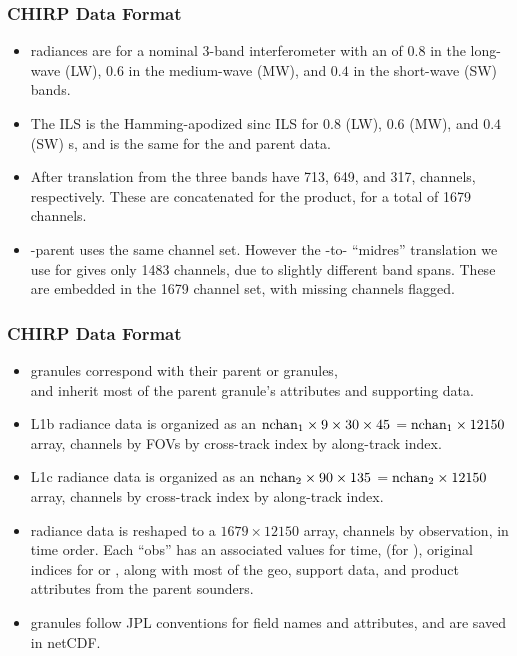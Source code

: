\documentclass[9pt]{beamer}
\begin{document}
\begin{frame}
\frametitle{CHIRP Data Format}
\begin{itemize}

  \item {\chirp} radiances are for a nominal 3-band interferometer 
    with an {\opd} of $0.8$ {\cm} in the long-wave (LW), $0.6$ {\cm}
    in the medium-wave (MW), and $0.4$ {\cm} in the short-wave (SW)
    bands.

  \item The {\chirp} ILS is the Hamming-apodized sinc ILS for $0.8$
    {\cm} (LW), $0.6$ {\cm} (MW), and $0.4$ {\cm} (SW) {\opd}s, and is
    the same for the {\airs} and {\cris} parent data.

  \item After translation from {\cris} the three bands have 713, 649,
    and 317, channels, respectively.  These are concatenated for the
    {\chirp} product, for a total of 1679 channels.

  \item {\airs}-parent {\chirp} uses the same channel set.  However
    the {\airs}-to-{\cris} ``midres'' translation we use for {\chirp}
    gives only 1483 channels, due to slightly different band spans.
    These are embedded in the 1679 channel set, with missing channels
    flagged.

\end{itemize}
\end{frame}
\begin{frame}
\frametitle{CHIRP Data Format}
\begin{itemize}

  \item {\chirp} granules correspond with their parent {\airs} or
    {\cris} granules, \\ and inherit most of the parent granule's
    attributes and supporting data.

  \item {\cris} L1b radiance data is organized as an $\mbox{nchan}_1
    \times 9 \times 30 \times 45$ $=\mbox{nchan}_1 \times 12150$ array,
    channels by FOVs by cross-track index by along-track index.

  \item {\airs} L1c radiance data is organized as an $\mbox{nchan}_2
    \times 90 \times 135$ $= \mbox{nchan}_2 \times 12150$ array, channels
    by cross-track index by along-track index.
  
  \item {\chirp} radiance data is reshaped to a $1679 \times 12150$
    array, channels by observation, in time order.  Each ``obs'' has
    an associated values for time, {\fov} (for {\cris}), original
    indices for {\airs} or {\cris}, along with most of the geo,
    support data, and product attributes from the parent sounders.

  \item {\chirp} granules follow JPL conventions for field names and
    attributes, and are saved in netCDF.

\end{itemize}
\end{frame}
\end{document}
